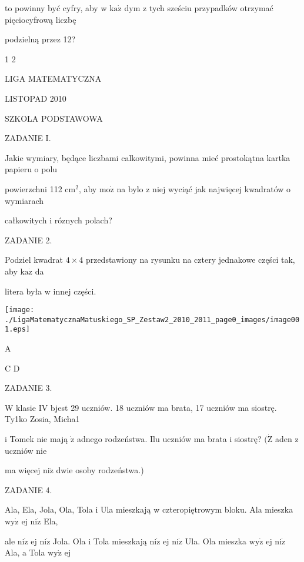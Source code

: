 \documentclass[a4paper,12pt]{article}
\begin{document}
to powinny być cyfry, aby w $\mathrm{k}\mathrm{a}\dot{\mathrm{z}}$ dym z tych sześciu przypadków otrzymać pięciocyfrową liczbę

podzielną przez 12?

1 2






LIGA MATEMATYCZNA

LISTOPAD 2010

SZKOLA PODSTAWOWA

ZADANIE I.

Jakie wymiary, będące liczbami calkowitymi, powinna mieć prostokątna kartka papieru o polu

powierzchni 112 $\mathrm{c}\mathrm{m}^{2}$, aby $\mathrm{m}\mathrm{o}\dot{\mathrm{z}}$ na bylo z niej wyciąć jak najwięcej kwadratów o wymiarach

całkowitych i róznych polach?

ZADANIE 2.

Podziel kwadrat $4\times 4$ przedstawiony na rysunku na cztery jednakowe części tak, aby $\mathrm{k}\mathrm{a}\dot{\mathrm{z}}$ da

litera była w innej części.
\begin{center}
\texttt{[image: ./LigaMatematycznaMatuskiego\_SP\_Zestaw2\_2010\_2011\_page0\_images/image001.eps]}
\end{center}
A

C D

ZADANIE 3.

$\mathrm{W}$ klasie IV bjest 29 uczniów. 18 uczniów ma brata, 17 uczniów ma siostrę. Ty1ko Zosia, Micha1

i Tomek nie mają $\dot{\mathrm{z}}$ adnego rodzeństwa. Ilu uczniów ma brata i siostrę? $(\dot{\mathrm{Z}}$ aden z uczniów nie

ma więcej $\mathrm{n}\mathrm{i}\dot{\mathrm{z}}$ dwie osoby rodzeństwa.)

ZADANIE 4.

Ala, Ela, Jola, Ola, Tola i Ula mieszkają w czteropiętrowym bloku. Ala mieszka $\mathrm{w}\mathrm{y}\dot{\mathrm{z}}$ ej $\mathrm{n}\mathrm{i}\dot{\mathrm{z}}$ Ela,

ale $\mathrm{n}\mathrm{i}\dot{\mathrm{z}}$ ej $\mathrm{n}\mathrm{i}\dot{\mathrm{z}}$ Jola. Ola i Tola mieszkają $\mathrm{n}\mathrm{i}\dot{\mathrm{z}}$ ej $\mathrm{n}\mathrm{i}\dot{\mathrm{z}}$ Ula. Ola mieszka $\mathrm{w}\mathrm{y}\dot{\mathrm{z}}$ ej $\mathrm{n}\mathrm{i}\dot{\mathrm{z}}$ Ala, a Tola $\mathrm{w}\mathrm{y}\dot{\mathrm{z}}$ ej
\end{document}
